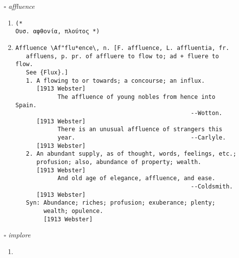 \documentclass{article}
\begin{document}
\begin{itemize}
\begin{enumerate}
{\begin{lstlisting}
(* 
Επιθ. επιπόλαιος, ελαφρός, τραλαλά *)
\end{lstlisting}}
\item{
\begin{lstlisting}
Frivolous \Friv"o*lous\, a. [L. frivolus; prob. akin to friare
   to rub, crumble, E. friable: cf. F. frivole.]
   [1913 Webster]
   1. Of little weight or importance; not worth notice; slight;
      as, a frivolous argument. --Swift.
      [1913 Webster]
   2. Given to trifling; marked with unbecoming levity; silly;
      interested especially in trifling matters.
      [1913 Webster]
            His personal tastes were low and frivolous.
                                                  --Macaulay.
   Syn: Trifling; trivial; slight; petty; worthless. --
        {Friv"o*lous*ly}, adv. -- {Friv"o*lous*ness}, n.
        [1913 Webster]
\end{lstlisting}}
\end{enumerate}
\item[$\square$] \emph{ affluence }
\begin{enumerate}
\item{
\begin{lstlisting}
(* 
Ουσ. αφθονία, πλούτος *)
\end{lstlisting}}
\item{
\begin{lstlisting}
Affluence \Af"flu*ence\, n. [F. affluence, L. affluentia, fr.
   affluens, p. pr. of affluere to flow to; ad + fluere to flow.
   See {Flux}.]
   1. A flowing to or towards; a concourse; an influx.
      [1913 Webster]
            The affluence of young nobles from hence into Spain.
                                                  --Wotton.
      [1913 Webster]
            There is an unusual affluence of strangers this
            year.                                 --Carlyle.
      [1913 Webster]
   2. An abundant supply, as of thought, words, feelings, etc.;
      profusion; also, abundance of property; wealth.
      [1913 Webster]
            And old age of elegance, affluence, and ease.
                                                  --Coldsmith.
      [1913 Webster]
   Syn: Abundance; riches; profusion; exuberance; plenty;
        wealth; opulence.
        [1913 Webster]
\end{lstlisting}}
\end{enumerate}
\item[$\square$] \emph{ implore }
\begin{enumerate}
\item{
}
\end{enumerate}
\end{itemize}
\end{document}
